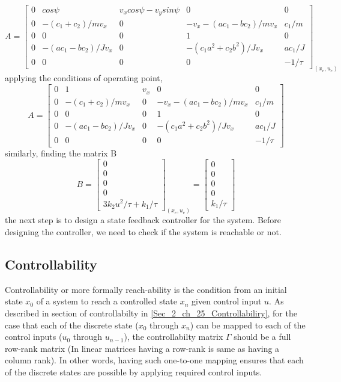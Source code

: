 \begin{equation}
	A = \begin{bmatrix}
	0 & cos\psi & v_x cos\psi - v_y sin\psi & 0 & 0 \\
	0 & -(c_1 + c_2)/m v_x & 0 & -v_x -(a c_1 - b c_2)/m v_x  & c_1 / m \\
	0 & 0 & 0 & 1 & 0 \\
	0 & -(a c_1 - b c_2)/J v_x & 0 & - (c_1 a^2 + c_2 b^2)/J v_x & a c_1 / J \\
	0 & 0 & 0 & 0 & -1/\tau
	\end{bmatrix}_{(x_e, u_e)}
\end{equation}
applying the conditions of operating point,
\begin{equation}
	A = \begin{bmatrix}
	0 & 1 & v_x & 0 & 0 \\
	0 & -(c_1 + c_2)/m v_x & 0 & -v_x -(a c_1 - b c_2)/m v_x & c_1 / m \\
	0 & 0 & 0 & 1 & 0 \\
	0 & -(a c_1 - b c_2)/J v_x & 0 & - (c_1 a^2 + c_2 b^2)/J v_x & a c_1 / J \\
	0 & 0 & 0 & 0 & -1/\tau
	\end{bmatrix}
\end{equation}
similarly, finding the matrix B
\begin{equation}
	B = \begin{bmatrix}
	 0 \\ 0 \\ 0 \\ 0 \\ 3 k_2 u^2 / \tau + k_1 / \tau
	\end{bmatrix}_{(x_e, u_e)} = \begin{bmatrix}
	0 \\ 0 \\ 0 \\ 0 \\ k_1 / \tau
	\end{bmatrix}
\end{equation}
the next step is to design a state feedback controller for the system. Before designing the controller, we need to check if the system is reachable or not.

\subsection{Controllability}
Controllability or more formally reach-ability is the condition from an initial state $x_0$ of a system to reach a controlled state $x_n$ given control input $u$. As described in section of controllabilty in \ref{Sec_2_ch_25_Controllabiliry}, for the case that each of the discrete state ($x_0$ through $x_n$) can be mapped to each of the control inputs ($u_0$ through $u_{n-1}$), the controllabilty matrix $\Gamma$ should be a full row-rank matrix (In linear matrices having a row-rank is same as having a column rank). In other words, having such one-to-one mapping ensures that each of the discrete states are possible by applying required control inputs.

